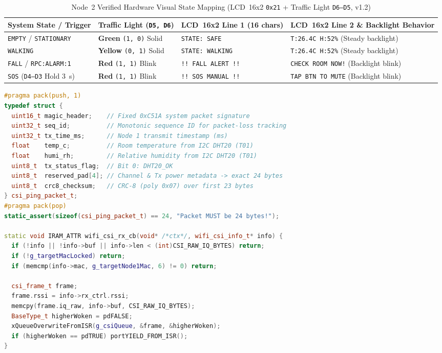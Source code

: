 \documentclass{hcmut-report}
\renewcommand{\arraystretch}{1.24}
\begin{document}
\begin{table}[H]
\centering
\caption{Node~2 Verified Hardware Visual State Mapping (LCD~16x2 \texttt{0x21} + Traffic Light \texttt{D6--D5}, v1.2)}
\label{tab:node2_visual_states}
\footnotesize
\renewcommand{\arraystretch}{1.08}
\begin{tabularx}{\textwidth}{|P{2.8cm}|C{2.7cm}|P{3.6cm}|Y|}
\hline
\textbf{System State / Trigger} & \textbf{Traffic Light (\texttt{D5, D6})} & \textbf{LCD~16x2 Line 1 (16 chars)} & \textbf{LCD~16x2 Line 2 \& Backlight Behavior} \\
\hline
\texttt{EMPTY} / \texttt{STATIONARY} & \textbf{Green} \texttt{(1, 0)} Solid & \texttt{STATE: SAFE} & \texttt{T:26.4C H:52\%} (Steady backlight) \\
\hline
\texttt{WALKING} & \textbf{Yellow} \texttt{(0, 1)} Solid & \texttt{STATE: WALKING} & \texttt{T:26.4C H:52\%} (Steady backlight) \\
\hline
\texttt{FALL} / \texttt{RPC:ALARM:1} & \textbf{Red} \texttt{(1, 1)} Blink & \texttt{!! FALL ALERT !!} & \texttt{CHECK ROOM NOW!} (Backlight blink) \\
\hline
\texttt{SOS} (\texttt{D4--D3} Hold 3~s) & \textbf{Red} \texttt{(1, 1)} Blink & \texttt{!! SOS MANUAL !!} & \texttt{TAP BTN TO MUTE} (Backlight blink) \\
\hline
\end{tabularx}
\end{table}

\begin{lstlisting}[language=C++, basicstyle=\scriptsize\ttfamily, caption={Core PHY-Layer CSI Callback and 24-Byte Frame Definition (\texttt{csi\_protocol.h} \& \texttt{node2\_rx\_csi/src/main.cpp})}, label={lst:csi_protocol}]
#pragma pack(push, 1)
typedef struct {
  uint16_t magic_header;    // Fixed 0xC51A system packet signature
  uint32_t seq_id;          // Monotonic sequence ID for packet-loss tracking
  uint32_t tx_time_ms;      // Node 1 transmit timestamp (ms)
  float    temp_c;          // Room temperature from I2C DHT20 (T01)
  float    humi_rh;         // Relative humidity from I2C DHT20 (T01)
  uint8_t  tx_status_flag;  // Bit 0: DHT20_OK
  uint8_t  reserved_pad[4]; // Channel & Tx power metadata -> exact 24 bytes
  uint8_t  crc8_checksum;   // CRC-8 (poly 0x07) over first 23 bytes
} csi_ping_packet_t;
#pragma pack(pop)
static_assert(sizeof(csi_ping_packet_t) == 24, "Packet MUST be 24 bytes!");

static void IRAM_ATTR wifi_csi_rx_cb(void* /*ctx*/, wifi_csi_info_t* info) {
  if (!info || !info->buf || info->len < (int)CSI_RAW_IQ_BYTES) return;
  if (!g_targetMacLocked) return;
  if (memcmp(info->mac, g_targetNode1Mac, 6) != 0) return;

  csi_frame_t frame;
  frame.rssi = info->rx_ctrl.rssi;
  memcpy(frame.iq_raw, info->buf, CSI_RAW_IQ_BYTES);
  BaseType_t higherWoken = pdFALSE;
  xQueueOverwriteFromISR(g_csiQueue, &frame, &higherWoken);
  if (higherWoken == pdTRUE) portYIELD_FROM_ISR();
}
\end{lstlisting}
\end{document}
